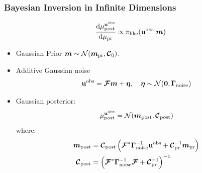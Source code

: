 \documentclass[
  pdf,
  10pt,
  xcolor={svgnames},
]{beamer}
\newcommand{\mc}[1]{\mathcal{#1}}
\newcommand{\mcb}[1]{\boldsymbol{\mathcal{#1}}}
\renewcommand{\vec}[1]{{\mathchoice
                     {\mbox{\boldmath$\displaystyle{#1}$}}
                     {\mbox{\boldmath$\textstyle{#1}$}}
                     {\mbox{\boldmath$\scriptstyle{#1}$}}
                     {\mbox{\boldmath$\scriptscriptstyle{#1}$}}}}
\newcommand{\mat}[1]{\mathbf{{#1}}}
\newcommand{\obs}{\mathbf{u}^{\rm obs}}
\begin{document}
\begin{frame}
  \frametitle{Bayesian Inversion in Infinite Dimensions}
  \begin{theorem}
    \[
      \dv{\mu^{\obs}_{\rm post}}{\mu_{\rm pr}}
      \propto
      \pi_{\rm like}(\obs | \vec{m})
    \]
  \end{theorem}
  \begin{itemize}
    \item Gaussian Prior $\vec{m} \sim \mc{N}(\vec{m}_{\rm pr}, \mcb{C}_0)$.
    \item Additive Gaussian noise
          \[
            \obs = \mcb{F} \vec{m} + \vb*{\eta},
            \quad \vb*{\eta} \sim \mc{N}(\vb{0}, \mat{\Gamma}_{\rm noise})
          \]
    \item Gaussian posterior:
          \[
            \mu^{\obs}_{\rm post}
            =
            \mc{N}(\vec{m}_{\rm post} , \mcb{C}_{\rm post})
          \]
          where:
          \begin{align*}
            \vec{m}_{\rm post}
             & =
            \mcb{C}_{\rm post}
            \left(
            \mcb{F}^* \vb{\Gamma}_{\rm noise}^{-1} \obs
            + \mcb{C}_{\rm pr}^{-1} \vec{m}_{\rm pr}
            \right)      \\
            \mcb{C}_{\rm post}
             & =
            \left(
            \mcb{F}^* \vb{\Gamma}_{\rm noise}^{-1} \mcb{F}
            + \mcb{C}_{\rm pr}^{-1}
            \right)^{-1} \\
          \end{align*}
  \end{itemize} \vspace{-1em}
\end{frame}
\end{document}
